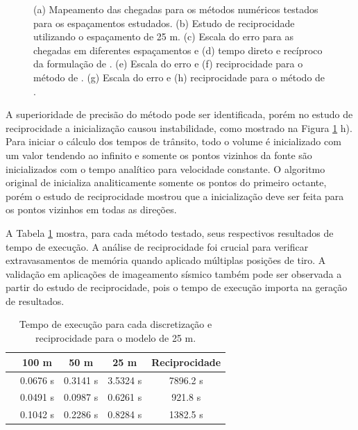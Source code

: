\begin{figure}[H]
	\caption{(a) Mapeamento das chegadas para os métodos numéricos testados para os espaçamentos estudados. (b) Estudo de reciprocidade utilizando o espaçamento de 25 m. (c) Escala do erro para as chegadas em diferentes espaçamentos e (d) tempo direto e recíproco da formulação de . (e) Escala do erro e (f) reciprocidade para o método de . (g) Escala do erro e (h) reciprocidade para o método de .}
	\label{fig:resultsNumericalComparison}
\end{figure}

A superioridade de precisão do método  pode ser identificada, porém no estudo de reciprocidade a inicialização causou instabilidade, como mostrado na Figura \ref{fig:resultsNumericalComparison} h). Para iniciar o cálculo dos tempos de trânsito, todo o volume é inicializado com um valor tendendo ao infinito e somente os pontos vizinhos da fonte são inicializados com o tempo analítico para velocidade constante. O algoritmo original de  inicializa analiticamente somente os pontos do primeiro octante, porém o estudo de reciprocidade mostrou que a inicialização deve ser feita para os pontos vizinhos em todas as direções.  

A Tabela \ref{table_refModel} mostra, para cada método testado, seus respectivos resultados de tempo de execução. A análise de reciprocidade foi crucial para verificar extravasamentos de memória quando aplicado múltiplas posições de tiro. A validação em aplicações de imageamento sísmico também pode ser observada a partir do estudo de reciprocidade, pois o tempo de execução importa na geração de resultados.  

\begin{table}[H]
	\caption{Tempo de execução para cada discretização e reciprocidade para o modelo de 25 m.}
	\begin{tabular}{r|cccc}
		& 100 m    & 50 m     & 25 m     & Reciprocidade \\ \hline
		\citeonline{podvin1991finite}   & 0.0676 s & 0.3141 s & 3.5324 s & 7896.2 s        \\ \hline
		\citeonline{jeong2008fast} & 0.0491 s & 0.0987 s & 0.6261 s & 921.8 s              \\ \hline
		\citeonline{noble2014accurate} & 0.1042 s & 0.2286 s & 0.8284 s & 1382.5 s          \\
	\end{tabular}
	\label{table_refModel}
\end{table}

